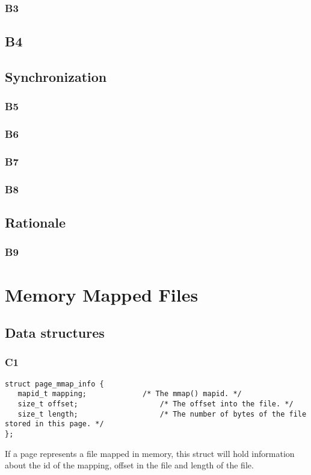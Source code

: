 \documentclass[a4wide, 11pt]{article}
\begin{document}
\subsubsection{B3}

\subsection{B4}

\subsection{Synchronization}
\subsubsection{B5}

\subsubsection{B6}

\subsubsection{B7}

\subsubsection{B8}

\subsection{Rationale}
\subsubsection{B9}


\section{Memory Mapped Files}
\subsection{Data structures}
\subsubsection{C1}
\begin{verbatim}
struct page_mmap_info {
   mapid_t mapping;				/* The mmap() mapid. */
   size_t offset;					/* The offset into the file. */
   size_t length;					/* The number of bytes of the file stored in this page. */
};
\end{verbatim}
If a page represents a file mapped in memory, this struct will hold information about the id of the mapping, offset in the file and length of the file.
\end{document}
